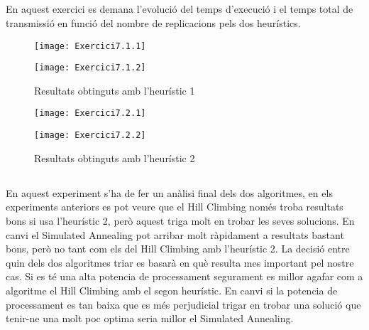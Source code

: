 \documentclass[a4paper, 12pt]{article}
\begin{document}
\subsection{}
En aquest exercici es demana l'evolució del temps d'execució i el temps total de transmissió en funció del
nombre de replicacions pels dos heurístics.

\begin{figure}[h!]
\begin{minipage}[b]{0.49\linewidth}
	\texttt{[image: Exercici7.1.1]}
\end{minipage}
\begin{minipage}[b]{0.49\linewidth}
	\texttt{[image: Exercici7.1.2]}
\end{minipage}
\caption{Resultats obtinguts amb l'heurístic 1}
\end{figure}

\begin{figure}[h!]
	\begin{minipage}[b]{0.49\linewidth}
		\texttt{[image: Exercici7.2.1]}
	\end{minipage}
	\begin{minipage}[b]{0.49\linewidth}
		\texttt{[image: Exercici7.2.2]}
	\end{minipage}
\caption{Resultats obtinguts amb l'heurístic 2}
\end{figure}

\newpage
\subsection{}
En aquest experiment s'ha de fer un anàlisi final dels dos algoritmes, en els experiments anteriors 
es pot veure que el Hill Climbing només troba resultats bons si usa l'heurístic 2, però aquest 
triga molt en trobar les seves solucions. En canvi el Simulated Annealing pot arribar molt ràpidament
a resultats bastant bons, però no tant com els del Hill Climbing amb l'heurístic 2. La decisió entre 
quin dels dos algoritmes triar es basarà en què resulta mes important pel nostre cas. Si es té una alta 
potencia de processament segurament es millor agafar com a algoritme el Hill Climbing amb el segon 
heurístic. En canvi si la potencia de processament es tan baixa que es més perjudicial trigar en trobar 
una solució que tenir-ne una molt poc optima seria millor el Simulated Annealing.
\end{document}
